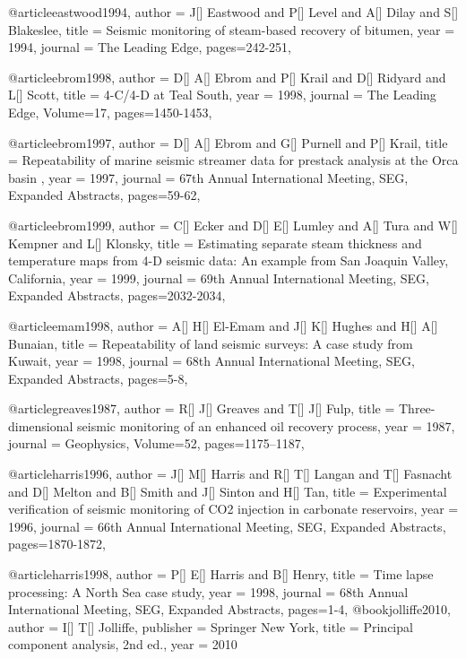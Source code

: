 @article{eastwood1994,
  author =	 {J[] Eastwood and P[] Level and A[] Dilay and S[] Blakeslee},
  title =	 {Seismic monitoring of steam-based recovery of bitumen},
  year =	 1994,
  journal =	 {The Leading Edge},
 pages=242-251,
}

@article{ebrom1998,
  author =	 {D[] A[] Ebrom and P[] Krail and D[] Ridyard and L[] Scott},
  title =	 {4-C/4-D at Teal South},
  year =	 1998,
  journal =	 {The Leading Edge},
    Volume=17,
 pages=1450-1453,
}

@article{ebrom1997,
  author =	 {D[] A[] Ebrom and G[] Purnell and P[] Krail},
  title =	 { Repeatability of marine seismic streamer data for prestack analysis at the Orca basin },
  year =	 1997,
  journal =	 {67th Annual International Meeting, SEG, Expanded Abstracts},
 pages=59-62,
}

@article{ebrom1999,
  author =	 {C[] Ecker and D[] E[] Lumley and A[] Tura and W[] Kempner and L[] Klonsky},
  title =	 {Estimating separate steam thickness and temperature maps from 4-D seismic data: An example from San Joaquin Valley, California},
  year =	 1999,
  journal =	 {69th Annual International Meeting, SEG, Expanded Abstracts},
 pages=2032-2034,
}

@article{emam1998,
  author =	 {A[] H[] El-Emam and J[] K[] Hughes and H[] A[] Bunaian},
  title =	 {Repeatability of land seismic surveys: A case study from Kuwait},
  year =	 1998,
  journal =	 {68th Annual International Meeting, SEG, Expanded Abstracts},
 pages=5-8,
}


@article{greaves1987,
  author =	 {R[] J[] Greaves and T[] J[] Fulp},
  title =	 {Three-dimensional seismic monitoring of an enhanced oil recovery process},
  year =	 1987,
  journal =	 {Geophysics},
    Volume=52,
 pages=1175–1187,
}

@article{harris1996,
  author =	 {J[] M[] Harris and R[] T[] Langan and T[] Fasnacht and D[] Melton and B[] Smith and J[] Sinton and H[] Tan},
  title =	 {Experimental verification of seismic monitoring of CO2 injection in carbonate reservoirs},
  year =	 1996,
  journal =	 {66th Annual International Meeting, SEG, Expanded Abstracts},
 pages=1870-1872,
}

@article{harris1998,
  author =	 {P[] E[] Harris and B[] Henry},
  title =	 {Time lapse processing: A North Sea case study},
  year =	 1998,
  journal =	 {68th Annual International Meeting, SEG, Expanded Abstracts},
 pages=1-4,
}
@book{jolliffe2010,
   author =       {I[] T[] Jolliffe},
   publisher =    {Springer New York},
   title =        {Principal component analysis, 2nd ed.},
   year =         {2010}
}

